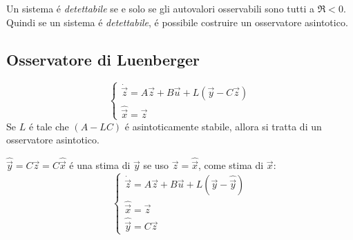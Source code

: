 \documentclass[../main.tex]{subfiles}
\begin{document}
		Un sistema \'e \textit{detettabile} se e solo se gli autovalori osservabili sono tutti a $ \Re < 0 $. Quindi se un sistema \'e \textit{detettabile}, \'e possibile costruire un osservatore asintotico.
		
	\subsection{Osservatore di Luenberger}
		\[
			\begin{cases}
				\dot{\vec z} = A \vec z + B \vec u + L (\vec y - C \vec z)\\
				\hat{\vec x} = \vec z
			\end{cases}
		\]
		Se $ L $ \'e tale che $ (A-LC) $ \'e asintoticamente stabile, allora si tratta di un osservatore asintotico.
		
		$ \hat{\vec y} = C \vec z = C \hat{\vec x} $ \'e una stima di $ \vec y $ se uso $ \vec z = \hat{\vec x} $, come stima di $ \vec x $:
		\[
			\begin{cases}
				\dot{\vec z} = A \vec z + B \vec u + L (\vec y - \hat{\vec y})\\
				\hat{\vec x} = \vec z\\
				\hat{\vec y} = C \vec z
			\end{cases}
		\]
		
\end{document}
